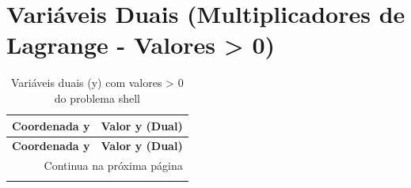 \documentclass[12pt]{article}
\begin{document}
\section{Variáveis Duais (Multiplicadores de Lagrange - Valores > 0)}

\begin{longtable}{@{}cc@{}}
\caption{Variáveis duais (y) com valores > 0 do problema shell} \\
\toprule
\textbf{Coordenada y} & \textbf{Valor y (Dual)} \\
\midrule
\endfirsthead

\toprule
\textbf{Coordenada y} & \textbf{Valor y (Dual)} \\
\midrule
\endhead

\midrule \multicolumn{2}{r}{{Continua na próxima página}} \\ \midrule
\endfoot


\end{longtable}
\end{document}
